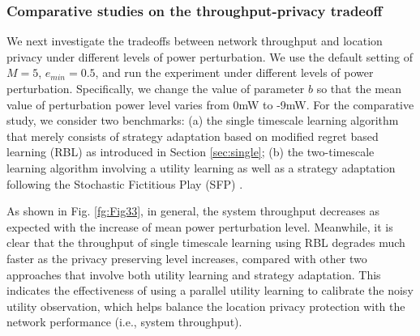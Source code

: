 \subsubsection{Comparative studies on the throughput-privacy tradeoff}
We next investigate the tradeoffs between network throughput and location privacy under different levels of power perturbation. We use the default setting of $M=5$, $e_{min}=0.5$, and run the experiment under different levels of power perturbation. Specifically, we change the value of parameter $b$ so that the mean value of perturbation power level varies from 0mW to -9mW. For the comparative study, we consider two benchmarks: (a) the single timescale learning algorithm that merely consists of strategy adaptation based on modified regret based learning (RBL) as introduced in Section \ref{sec:single}; (b) the two-timescale learning algorithm involving a utility learning as well as a strategy adaptation following the Stochastic Fictitious Play (SFP) \cite{ZhangGlobe}. 

As shown in Fig. \ref{fg:Fig33}, in general, the system throughput decreases as expected with the increase of mean power perturbation level. Meanwhile, it is clear that the throughput of single timescale learning using RBL degrades much faster as the privacy preserving level increases, compared with other two approaches that involve both utility learning and strategy adaptation. This indicates the effectiveness of using a parallel utility learning to calibrate the noisy utility observation, which helps balance the location privacy protection with the network performance (i.e., system throughput). 

